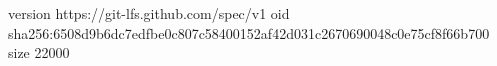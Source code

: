 version https://git-lfs.github.com/spec/v1
oid sha256:6508d9b6dc7edfbe0c807c58400152af42d031c2670690048c0e75cf8f66b700
size 22000
